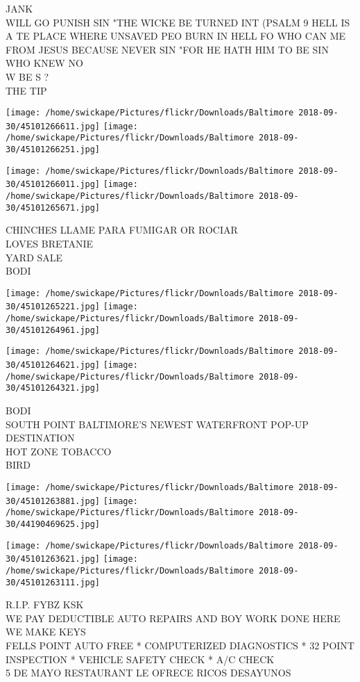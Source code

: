 \documentclass[10pt,letterpaper]{article}
\begin{document}
JANK\\
WILL GO PUNISH SIN "THE WICKE BE TURNED INT (PSALM 9 HELL IS A TE PLACE WHERE UNSAVED PEO BURN IN HELL FO WHO CAN ME FROM JESUS BECAUSE NEVER SIN "FOR HE HATH HIM TO BE SIN WHO KNEW NO\\
W BE S ?\\
THE TIP
\pagebreak

\texttt{[image: /home/swickape/Pictures/flickr/Downloads/Baltimore 2018-09-30/45101266611.jpg]}
\texttt{[image: /home/swickape/Pictures/flickr/Downloads/Baltimore 2018-09-30/45101266251.jpg]}

\texttt{[image: /home/swickape/Pictures/flickr/Downloads/Baltimore 2018-09-30/45101266011.jpg]}
\texttt{[image: /home/swickape/Pictures/flickr/Downloads/Baltimore 2018-09-30/45101265671.jpg]}

CHINCHES LLAME PARA FUMIGAR OR ROCIAR\\
LOVES BRETANIE\\
YARD SALE\\
BODI
\pagebreak

\texttt{[image: /home/swickape/Pictures/flickr/Downloads/Baltimore 2018-09-30/45101265221.jpg]}
\texttt{[image: /home/swickape/Pictures/flickr/Downloads/Baltimore 2018-09-30/45101264961.jpg]}

\texttt{[image: /home/swickape/Pictures/flickr/Downloads/Baltimore 2018-09-30/45101264621.jpg]}
\texttt{[image: /home/swickape/Pictures/flickr/Downloads/Baltimore 2018-09-30/45101264321.jpg]}

BODI\\
SOUTH POINT BALTIMORE'S NEWEST WATERFRONT POP{-}UP DESTINATION\\
HOT ZONE TOBACCO\\
BIRD
\pagebreak

\texttt{[image: /home/swickape/Pictures/flickr/Downloads/Baltimore 2018-09-30/45101263881.jpg]}
\texttt{[image: /home/swickape/Pictures/flickr/Downloads/Baltimore 2018-09-30/44190469625.jpg]}

\texttt{[image: /home/swickape/Pictures/flickr/Downloads/Baltimore 2018-09-30/45101263621.jpg]}
\texttt{[image: /home/swickape/Pictures/flickr/Downloads/Baltimore 2018-09-30/45101263111.jpg]}

R.I.P. FYBZ KSK\\
WE PAY DEDUCTIBLE AUTO REPAIRS AND BOY WORK DONE HERE WE MAKE KEYS\\
FELLS POINT AUTO FREE * COMPUTERIZED DIAGNOSTICS * 32 POINT INSPECTION * VEHICLE SAFETY CHECK * A/C CHECK\\
5 DE MAYO RESTAURANT LE OFRECE RICOS DESAYUNOS
\pagebreak
\end{document}
